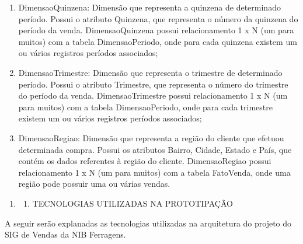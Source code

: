\documentclass[a4paper]{article}
\newcommand\liststyleWWviiiNumi{%
\renewcommand\theenumi{\arabic{enumi}}
\renewcommand\theenumii{\arabic{enumi}.\arabic{enumii}}
\renewcommand\theenumiii{\arabic{enumi}.\arabic{enumii}.\arabic{enumiii}}
\renewcommand\theenumiv{\arabic{enumi}.\arabic{enumii}.\arabic{enumiii}.\arabic{enumiv}}
\renewcommand\labelenumi{\theenumi}
\renewcommand\labelenumii{\theenumii}
\renewcommand\labelenumiii{\theenumiii}
\renewcommand\labelenumiv{\theenumiv.}
}
\begin{document}
\begin{enumerate}
{{tabela DimensaoPeriodo possui relacionamento com 1 x N (um para muitos) com as tabelas FatoVenda, FatoMeta,
FatoReceitaVendas e FatoPrevisaoVendas, onde para cada produto podem existir um ou v\'arios registros nas tabelas Fato
citadas;}}
\item {
\textsf{DimensaoQuinzena: Dimens\~ao que representa a quinzena de determinado per\'iodo. Possui o atributo Quinzena, que
representa o n\'umero da quinzena do per\'iodo da venda. DimensaoQuinzena possui relacionamento 1 x N (um para muitos)
com a tabela DimensaoPeriodo, onde para cada quinzena existem um ou v\'arios registros per\'iodos associados;}}
\item {
\textsf{DimensaoTrimestre: Dimens\~ao que representa o trimestre de determinado per\'iodo. Possui o atributo Trimestre,
que representa o n\'umero do trimestre do per\'iodo da venda. DimensaoTrimestre possui relacionamento 1 x N (um para
muitos) com a tabela DimensaoPeriodo, onde para cada trimestre existem um ou v\'arios registros per\'iodos
associados;}}
\item {
\textsf{DimensaoRegiao: Dimens\~ao que representa a regi\~ao do cliente que efetuou determinada compra. Possui os
atributos Bairro, Cidade, Estado e Pa\'is, que cont\'em os dados referentes \`a regi\~ao do cliente. DimensaoRegiao
possui }\textsf{relacionamento 1 x N (um para muitos) com a tabela FatoVenda, onde uma regi\~ao pode possuir uma ou
v\'arias vendas.}}
\end{enumerate}

\bigskip

\liststyleWWviiiNumi
\begin{enumerate}
\item \begin{enumerate}
\item {
\textsf{TECNOLOGIAS UTILIZADAS NA PROTOTIPA\c{C}\~AO}}
\end{enumerate}
\end{enumerate}
{\sffamily
A seguir ser\~ao explanadas as tecnologias utilizadas na arquitetura do projeto do SIG de Vendas da NIB Ferragens.}


\bigskip
\end{document}
